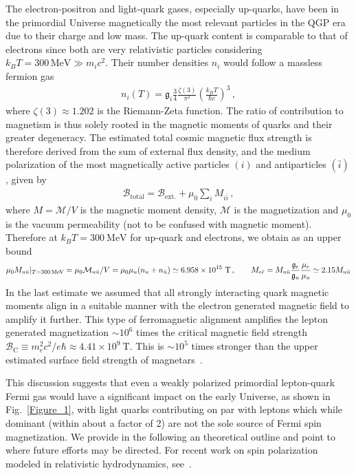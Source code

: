\documentclass[epjST]{svjour}
\newcommand*{\MeV}{\text{\,MeV}}
\begin{document}
The electron-positron and light-quark gases, especially up-quarks, have been in the primordial Universe magnetically the most relevant particles in the QGP era due to their charge and low mass. The up-quark content is comparable to that of electrons since both are very relativistic particles considering \(k_{B}T=300\,\mathrm{MeV}\gg m_i c^{2}\). Their number densities \(n_{i}\) would follow a massless fermion gas 
\begin{align}
    n_{i}(T) = \mathfrak{g}_{i}\frac{3}{4}\frac{\zeta(3)}{\pi^{2}}\left(\frac{k_{B}T}{\hbar c}\right)^{3}\,,
\end{align}
where \(\zeta(3)\approx1.202\) is the Riemann-Zeta function. The ratio of contribution to magnetism is thus solely rooted in the magnetic moments of quarks and their greater degeneracy. The estimated total cosmic magnetic flux strength is therefore derived from the sum of external flux density, and the medium polarization of the most magnetically active particles \((i)\) and antiparticles \((\bar{i})\), given by
\begin{align}
    \mathcal{B}_\mathrm{total}=\mathcal{B}_\mathrm{ext.}+\mu_{0}\sum_{i} M_{i\bar{i}}\,,
\end{align}
where \(M=\mathcal{M}/V\) is the magnetic moment density, \(\mathcal{M}\) is the magnetization and \(\mu_{0}\) is the vacuum permeability (not to be confused with magnetic moment). Therefore at \(k_{B}T=300~\mathrm{MeV}\) for up-quark and electrons, we obtain as an upper bound
\begin{align}
    \mu_{0}M_{u\bar{u}}\vert_{T=300\MeV} = \mu_{0}\mathcal{M}_{u\bar{u}}/V = \mu_{0}\mu_{u}(n_{u}+n_{\bar{u}})  \simeq 6.958\times10^{15}~\mathrm{T} \,,\qquad
    M_{e\bar{e}}=M_{u\bar{u}}\frac{\mathfrak{g}_{e}}{\mathfrak{g}_{u}} \frac{\mu_{e}}{\mu_{u}} \simeq 2.15 M_{u\bar{u}}
\end{align}
In the last estimate we assumed that all strongly interacting quark magnetic moments align in a suitable manner with the electron generated magnetic field to amplify it further. This type of ferromagnetic alignment  amplifies the lepton generated magnetization  \(\sim 10^{6}\) times the critical magnetic field strength \(\mathcal{B}_\mathrm{C}\equiv m_{e}^{2}c^{2}/e\hbar\approx 4.41\times10^{9}\ \mathrm{T}\). This is \(\sim 10^5\) times stronger than the upper estimated surface field strength of magnetars~\cite{Kaspi:2017fwg}.

This discussion suggests that even a weakly polarized primordial lepton-quark Fermi gas would have a significant impact on the early Universe, as shown in Fig.~\ref{Figure_1}, with light quarks contributing on par with leptons which while dominant (within about a factor of 2) are not the sole source of Fermi spin magnetization. We provide in the following an theoretical outline and point to where future efforts may be directed. For recent work on spin polarization modeled in relativistic hydrodynamics, see~\cite{Florkowski:2024cif,Bhadury:2024whs,Becattini:2024uha,Singh:2024cub}.
\end{document}
